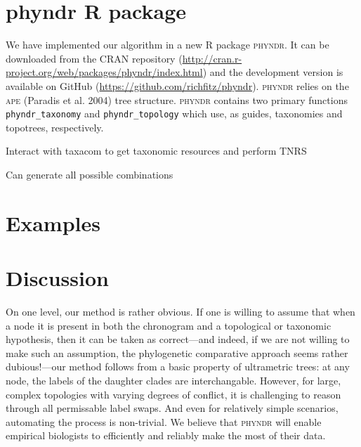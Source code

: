 \documentclass[a4paper,11pt]{article}
\begin{document}
\section{phyndr R package}

We have implemented our algorithm in a new R package \textsc{phyndr}. It can be downloaded from the CRAN repository (\url{http://cran.r-project.org/web/packages/phyndr/index.html}) and the development version is available on GitHub (\url{https://github.com/richfitz/phyndr}). \textsc{phyndr} relies on the \textsc{ape} (Paradis et al. 2004) tree structure. \textsc{phyndr} contains two primary functions \texttt{phyndr\_taxonomy} and \texttt{phyndr\_topology} which use, as guides, taxonomies and topotrees, respectively. 

Interact with taxacom to get taxonomic resources and perform TNRS

Can generate all possible combinations

\section{Examples}

\section{Discussion}

On one level, our method is rather obvious. If one is willing to assume that when a node it is present in both the chronogram and a topological or taxonomic hypothesis, then it can be taken as correct---and indeed, if we are not willing to make such an assumption, the phylogenetic comparative approach seems rather dubious!---our method follows from a basic property of ultrametric trees: at any node, the labels of the daughter clades are interchangable. However, for large, complex topologies with varying degrees of conflict, it is challenging to reason through all permissable label swaps. And even for relatively simple scenarios, automating the process is non-trivial. We believe that \textsc{phyndr} will enable empirical biologists to efficiently and reliably make the most of their data.
\end{document}
